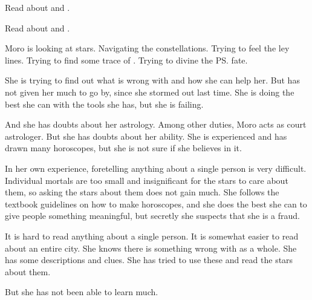 
Read about  and . 

Read about  and . 





\begin{comment}
  \section{Astrology}
\end{comment}
Moro is looking at stars. 
Navigating the constellations.
Trying to feel the ley lines.
Trying to find some trace of \Tiroco. 
Trying to divine the \ps{\rinyuth} fate. 


She is trying to find out what is wrong with \Tiroco and how she can help her. 
But \Tiroco has not given her much to go by, since she stormed out last time. 
She is doing the best she can with the tools she has, but she is failing. 

And she has doubts about her astrology. 
Among other duties, Moro acts as court astrologer. 
But she has doubts about her ability. 
She is experienced and has drawn many horoscopes, but she is not sure if she believes in it. 

In her own experience, foretelling anything about a single person is very difficult. 
Individual mortals are too small and insignificant for the stars to care about them, so asking the stars about them does not gain much. 
She follows the textbook guidelines on how to make horoscopes, and she does the best she can to give people something meaningful, but secretly she suspects that she is a fraud. 

It is hard to read anything about a single person. 
It is somewhat easier to read about an entire city. 
She knows there is something wrong with \Malcur as a whole. 
She has some descriptions and clues. 
She has tried to use these and read the stars about them. 

But she has not been able to learn much. 





\begin{comment}
  \section{Moro calls on \Nasshikerr}
\end{comment}

